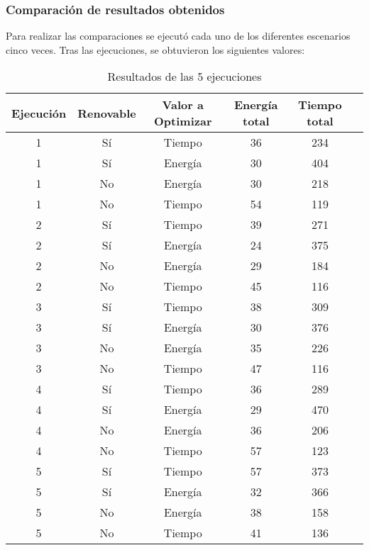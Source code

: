 \documentclass{article}
\begin{document}
\subsubsection{Comparación de resultados obtenidos}
Para realizar las comparaciones se ejecutó cada uno de los diferentes escenarios cinco veces. Tras las ejecuciones, se obtuvieron los siguientes valores:
\newpage
\begin{table}[h!]
    \centering
    \caption{Resultados de las 5 ejecuciones}
        \label{tab:data}
    \begin{tabular}{cccccc}
    \hline
    \textbf{Ejecución} & \textbf{Renovable} & \textbf{Valor a Optimizar} & \textbf{Energía total} & \textbf{Tiempo total} \\
    \hline
    1 & Sí & Tiempo & 36 & 234 \\
    1 & Sí & Energía & 30 & 404 \\
    1 & No & Energía & 30 & 218 \\
    1 & No & Tiempo & 54 & 119 \\
    \hline
    2 & Sí & Tiempo & 39 & 271 \\
    2 & Sí & Energía & 24 & 375 \\
    2 & No & Energía & 29 & 184 \\
    2 & No & Tiempo & 45 & 116 \\
    \hline
    3 & Sí & Tiempo & 38 & 309 \\
    3 & Sí & Energía & 30 & 376 \\
    3 & No & Energía & 35 & 226 \\
    3 & No & Tiempo & 47 & 116 \\
    \hline
    4 & Sí & Tiempo & 36 & 289 \\
    4 & Sí & Energía & 29 & 470 \\
    4 & No & Energía & 36 & 206 \\
    4 & No & Tiempo & 57 & 123 \\
    \hline
    5 & Sí & Tiempo & 57 & 373 \\
    5 & Sí & Energía & 32 & 366 \\
    5 & No & Energía & 38 & 158 \\
    5 & No & Tiempo & 41 & 136 \\
    \hline
    \end{tabular}
    
    \label{tabla:resultados}
    \end{table}
\end{document}
